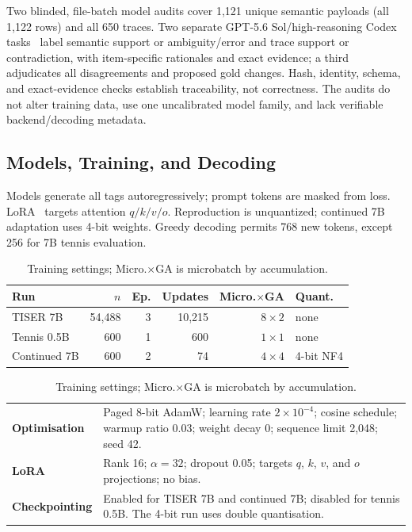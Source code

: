 \documentclass[conference]{IEEEtran}
\begin{document}
Two blinded, file-batch model audits cover 1,121 unique semantic payloads (all 1,122 rows) and all 650 traces. Two separate GPT-5.6 Sol/high-reasoning Codex tasks~\cite{openai2026codexapp} label semantic support or ambiguity/error and trace support or contradiction, with item-specific rationales and exact evidence; a third adjudicates all disagreements and proposed gold changes. Hash, identity, schema, and exact-evidence checks establish traceability, not correctness. The audits do not alter training data, use one uncalibrated model family, and lack verifiable backend/decoding metadata.

\subsection{Models, Training, and Decoding}

Models generate all tags autoregressively; prompt tokens are masked from loss. LoRA~\cite{hu2022lora} targets attention $q/k/v/o$. Reproduction is unquantized; continued 7B adaptation uses 4-bit weights. Greedy decoding permits 768 new tokens, except 256 for 7B tennis evaluation.

\begin{table}[t]
\centering
\caption{Training settings; Micro.$\times$GA is microbatch by accumulation.}
\label{tab:settings}
\setlength{\tabcolsep}{2.3pt}
{\footnotesize
\begin{tabular}{lrrrrl}
\toprule
\textbf{Run} & \textbf{$n$} & \textbf{Ep.} & \textbf{Updates} & \textbf{Micro.$\times$GA} & \textbf{Quant.} \\
\midrule
TISER 7B & 54{,}488 & 3 & 10{,}215 & $8{\times}2$ & none \\
Tennis 0.5B & 600 & 1 & 600 & $1{\times}1$ & none \\
Continued 7B & 600 & 2 & 74 & $4{\times}4$ & 4-bit NF4 \\
\bottomrule
\end{tabular}

\vspace{0.4em}
\begin{tabular}{@{}lp{}@{}}
\textbf{Optimisation} & Paged 8-bit AdamW; learning rate $2{\times}10^{-4}$; cosine schedule; warmup ratio 0.03; weight decay 0; sequence limit 2,048; seed 42. \\
\textbf{LoRA} & Rank 16; $\alpha=32$; dropout 0.05; targets $q$, $k$, $v$, and $o$ projections; no bias. \\
\textbf{Checkpointing} & Enabled for TISER 7B and continued 7B; disabled for tennis 0.5B. The 4-bit run uses double quantisation. \\
\end{tabular}
}
\end{table}
\end{document}
